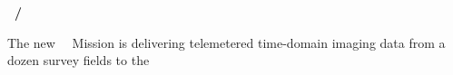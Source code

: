\documentclass[12pt]{article}
\begin{document}
\noindent\textbf{\shortauthor~/~\fulltitle}

The new \kepler\ \ketu\ Mission is delivering telemetered time-domain
imaging data from a dozen survey fields to the
\end{document}
